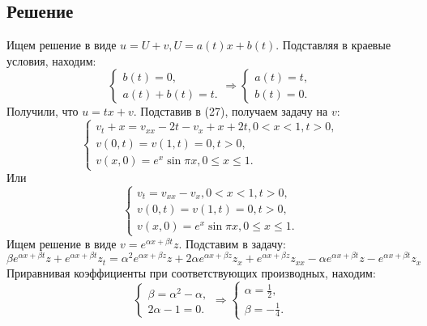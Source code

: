 \documentclass[11pt]{article}
\begin{document}
\subsection{Решение}
\label{sec:orge30629d}
Ищем решение в виде $u = U + v, U = a(t)x + b(t)$. Подставляя в краевые условия, находим:
\begin{equation*}
\begin{cases}
b(t) = 0, \\
a(t) + b(t) = t.
\end{cases}
\Rightarrow
\begin{cases}
a(t) = t, \\
b(t) = 0.
\end{cases}
\end{equation*}
Получили, что $u = tx + v$. Подставив в (27), получаем задачу на $v$:
\begin{equation*}
\begin{cases}
v_t + x = v_{xx} - 2t - v_{x} + x + 2t, 0 < x < 1, t > 0, \\
v(0, t) = v(1, t) = 0, t > 0, \\
v(x, 0) = e^x\sin\pi x, 0 \leq x \leq 1.
\end{cases}
\end{equation*}
Или
\begin{equation}
\begin{cases}
v_t = v_{xx} - v_x, 0 < x < 1, t > 0, \\
v(0, t) = v(1, t) = 0, t > 0, \\
v(x, 0) = e^x\sin\pi x, 0 \leq x \leq 1.
\end{cases}
\end{equation}
Ищем решение в виде $v = e^{\alpha x + \beta t}z$. Подставим в задачу:
\begin{equation*}
\beta e^{\alpha x + \beta t}z + e^{\alpha x + \beta t}z_t = \alpha^2e^{\alpha x + \beta z}z +
2\alpha e^{\alpha x + \beta z}z_x + e^{\alpha x + \beta z}z_{xx} - \alpha e^{\alpha x + \beta t}z -
e^{\alpha x + \beta t}z_x
\end{equation*}
Приравнивая коэффициенты при соответствующих производных, находим:
\begin{equation*}
\begin{cases}
\beta = \alpha^2 - \alpha, \\
2\alpha - 1 = 0.
\end{cases}
\Rightarrow
\begin{cases}
\alpha = \frac12, \\
\beta = -\frac14.
\end{cases}
\end{equation*}
\end{document}
